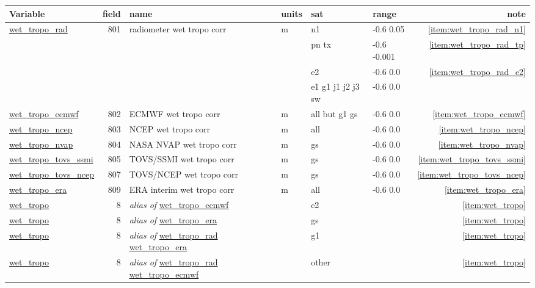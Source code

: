 \documentclass[a4paper,11pt,openany,natbib,nomargin]{thesis}
\makeatletter
\newcommand\var[1]{\url{#1}\index{variables!#1@\protect\url{#1}}}
\newcommand\alias[1]{\emph{alias of} \var{#1}}
\newenvironment{vartable}{
\begin{table}[ht]
\small
\begin{tabular}{lrllllr}
\hline
Variable & field & name & units & sat & range & note \\
\hline
}{
\hline
\end{tabular}
\end{table}
}
\makeatother
\begin{document}
\begin{vartable}
\var{wet_tropo_rad} & 801 & radiometer wet tropo corr & m & n1 & -0.6 0.05 & \ref{item:wet_tropo_rad_n1} \\
                    &     &                           &   & pn tx & -0.6 -0.001 & \ref{item:wet_tropo_rad_tp} \\
                    &     &                           &   & e2 & -0.6 0.0 & \ref{item:wet_tropo_rad_e2} \\
                    &     &                           &   & e1 g1 j1 j2 j3 sw & -0.6 0.0 & \\
\var{wet_tropo_ecmwf} & 802 & ECMWF wet tropo corr    & m & all but g1 gs & -0.6 0.0 & \ref{item:wet_tropo_ecmwf} \\
\var{wet_tropo_ncep} & 803 & NCEP wet tropo corr      & m & all & -0.6 0.0 & \ref{item:wet_tropo_ncep} \\
\var{wet_tropo_nvap} & 804 & NASA NVAP wet tropo corr & m & gs & -0.6 0.0 & \ref{item:wet_tropo_nvap} \\
\var{wet_tropo_tovs_ssmi} & 805 & TOVS/SSMI wet tropo corr & m & gs & -0.6 0.0 & \ref{item:wet_tropo_tovs_ssmi} \\
\var{wet_tropo_tovs_ncep} & 807 & TOVS/NCEP wet tropo corr & m & gs & -0.6 0.0 & \ref{item:wet_tropo_tovs_ncep} \\
\var{wet_tropo_era} & 809 & ERA interim wet tropo corr & m & all & -0.6 0.0 & \ref{item:wet_tropo_era} \\
\hline
\var{wet_tropo} & 8 & \alias{wet_tropo_ecmwf} & & c2 & & \ref{item:wet_tropo} \\
\var{wet_tropo} & 8 & \alias{wet_tropo_era} & & gs & & \ref{item:wet_tropo} \\
\var{wet_tropo} & 8 & \alias{wet_tropo_rad} \var{wet_tropo_era} & & g1 & & \ref{item:wet_tropo} \\
\var{wet_tropo} & 8 & \alias{wet_tropo_rad} \var{wet_tropo_ecmwf} & & other & & \ref{item:wet_tropo} \\
\end{vartable}
\end{document}
